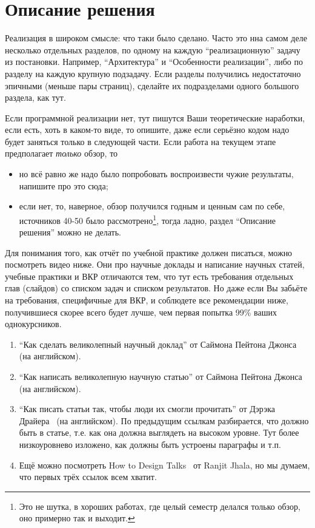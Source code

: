 
\section{Описание решения}
Реализация в широком смысле: что таки было сделано. Часто это нна самом деле несколько отдельных разделов, по одному на каждую \enquote{реализационную} задачу из постановки. Например, \enquote{Архитектура} и \enquote{Особенности реализации}, либо по разделу на каждую крупную подзадачу. Если разделы получились недостаточно эпичными (меньше пары страниц), сделайте их подразделами одного большого раздела, как тут.

Если программной реализации нет, тут пишутся Ваши теоретические наработки, если есть, хоть в каком-то виде, то опишите, даже если серьёзно кодом надо будет заняться только в следующей части. Если работа на текущем этапе предполагает \emph{только} обзор, то
\begin{itemize}
    \item но всё равно же надо было попробовать воспроизвести чужие результаты, напишите про это сюда;
    \item если нет, то, наверное, обзор получился годным и ценным сам по себе, источников 40-50 было рассмотрено\footnote{Это не шутка, в хороших работах, где целый семестр делался только обзор, оно примерно так и выходит.}, тогда ладно, раздел \enquote{Описание решения} можно не делать.
\end{itemize}

Для понимания того, как отчёт по учебной практике должен писаться, можно посмотреть видео ниже. Они про научные доклады и написание научных статей, учебные практики и ВКР отличаются тем, что тут есть требования отдельных глав (слайдов) со списком задач и списком результатов. Но даже если Вы забьёте на требования, специфичные для ВКР, и соблюдете все рекомендации ниже, получившиеся скорее всего будет лучше, чем первая попытка 99\% ваших однокурсников.

\begin{enumerate}
    \item \enquote{Как сделать великолепный научный доклад} от Саймона Пейтона Джонса~\cite{SPJGreatTalk} (на английском).
    \item \enquote{Как написать великолепную научную статью} от Саймона Пейтона Джонса~\cite{SPJGreatPaper} (на английском).
    \item \enquote{Как писать статьи так, чтобы люди их смогли прочитать} от Дэрэка Драйера~\cite{DreyerYoutube2020} (на английском). По предыдущим ссылкам разбирается, что должно быть в статье, т.е. как она должна выгля\-деть на высоком уровне. Тут более низкоуровнево изложено, как должны быть устроены параграфы и т.п.
    \item Ещё можно посмотреть How to Design Talks~\cite{JhalaYoutube2020} от Ranjit Jhala, но мы думаем, что первых трёх ссылок всем хватит.
\end{enumerate}

